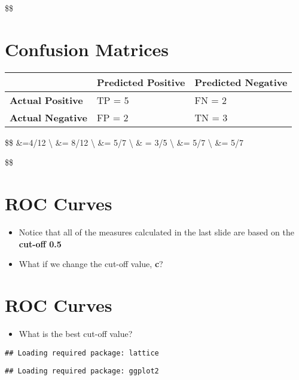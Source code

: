\documentclass[
]{article}
\providecommand{\tightlist}{%
  \setlength{\itemsep}{0pt}\setlength{\parskip}{0pt}}
\begin{document}
\$\$

\hypertarget{confusion-matrices-3}{%
\section{Confusion Matrices}\label{confusion-matrices-3}}

\begin{longtable}[]{@{}lll@{}}
\toprule
& Predicted Positive & Predicted Negative\tabularnewline
\midrule
\endhead
\textbf{Actual Positive} & TP = 5 & FN = 2\tabularnewline
\textbf{Actual Negative} & FP = 2 & TN = 3\tabularnewline
\bottomrule
\end{longtable}

\$\$  \&=4/12 \textbackslash{}
 \&= 8/12 \textbackslash{}  \&= 5/7
\textbackslash{}  \& = 3/5 \textbackslash{}
 \&= 5/7 \textbackslash{}  \&= 5/7

\$\$

\hypertarget{roc-curves}{%
\section{ROC Curves}\label{roc-curves}}

\begin{itemize}
\item
  Notice that all of the measures calculated in the last slide are based
  on the \textbf{cut-off 0.5}
\item
  What if we change the cut-off value, \textbf{c}?
\end{itemize}

\hypertarget{roc-curves-1}{%
\section{ROC Curves}\label{roc-curves-1}}

\begin{itemize}
\tightlist
\item
  What is the best cut-off value?
\end{itemize}

\begin{verbatim}
## Loading required package: lattice
\end{verbatim}

\begin{verbatim}
## Loading required package: ggplot2
\end{verbatim}
\end{document}
